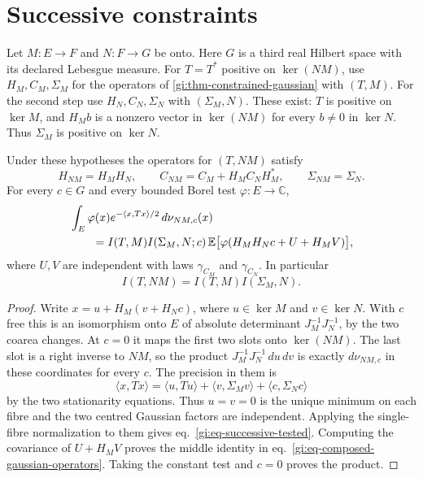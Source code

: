 \documentclass[11pt,letterpaper,reqno]{amsart}
\makeatletter
\numberwithin{equation}{section}
\renewcommand{\eqref}[1]{\textup{eq.~\ref{#1}}}
\theoremstyle{definition}
\newcommand{\ms@minorstart}{%
  \pushQED{\qed}\renewcommand{\qedsymbol}{$\blacksquare$}}
\newenvironment{proposition}[1][]{\ms@minorstart\ms@proposition[#1]}
  {\popQED\endms@proposition}
\theoremstyle{remark}
\makeatother
\begin{document}
\section{Successive constraints}
\label{gi:sec-successive}

Let \(M:E\to F\) and \(N:F\to G\) be onto. Here \(G\) is
a third real Hilbert space with its declared Lebesgue measure.
For \(T=T^*\) positive on \(\ker(NM)\), use \(H_M,C_M,\Sigma_M\)
for the operators of \cref{gi:thm-constrained-gaussian}
with \((T,M)\). For the second step use \(H_N,C_N,\Sigma_N\)
with \((\Sigma_M,N)\). These exist: \(T\) is positive on
\(\ker M\), and \(H_M b\) is a nonzero vector in \(\ker(NM)\)
for every \(b\ne0\) in \(\ker N\). Thus \(\Sigma_M\) is
positive on \(\ker N\).

\begin{proposition}[Gaussian composition]
\label{gi:prop-successive}
Under these hypotheses the operators for \((T,NM)\) satisfy
\begin{equation}\label{gi:eq-composed-gaussian-operators}
 H_{NM}=H_M H_N,\qquad
 C_{NM}=C_M+H_M C_N H_M^*,\qquad
 \Sigma_{NM}=\Sigma_N .
\end{equation}
For every \(c\in G\) and every bounded Borel test
\(\varphi:E\to\mathbb C\),
\begin{align}
 &\int_E\varphi(x)e^{-\langle x,Tx\rangle/2}\,d\nu_{NM,c}(x)\notag\\
 &\qquad=I(T,M)I(\Sigma_M,N;c)\,
        \mathbb E\bigl[\varphi(H_MH_Nc+U+H_M V)\bigr],
 \label{gi:eq-successive-tested}
\end{align}
where \(U,V\) are independent with laws \(\gamma_{C_M}\)
and \(\gamma_{C_N}\). In particular
\begin{equation}\label{gi:eq-successive-normalizers}
                     I(T,NM)=I(T,M)I(\Sigma_M,N).
\end{equation}
\end{proposition}

\begin{proof}
Write \(x=u+H_M(v+H_Nc)\), where \(u\in\ker M\)
and \(v\in\ker N\). With \(c\) free this is an
isomorphism onto \(E\) of absolute determinant
\(J_M^{-1}J_N^{-1}\), by the two coarea changes.
At \(c=0\) it maps the first two slots onto \(\ker(NM)\).
The last slot is a right inverse to \(NM\), so the
product \(J_M^{-1}J_N^{-1}\,du\,dv\) is exactly
\(d\nu_{NM,c}\) in these coordinates for every \(c\).
The precision in them is
\[
 \langle x,Tx\rangle
  =\langle u,Tu\rangle+\langle v,\Sigma_Mv\rangle
                                  +\langle c,\Sigma_Nc\rangle
\]
by the two stationarity equations. Thus \(u=v=0\) is
the unique minimum on each fibre and the two centred
Gaussian factors are independent. Applying the
single-fibre normalization to them gives
\eqref{gi:eq-successive-tested}. Computing the covariance
of \(U+H_MV\) proves the middle identity in
\eqref{gi:eq-composed-gaussian-operators}. Taking the
constant test and \(c=0\) proves the product.
\end{proof}
\end{document}
